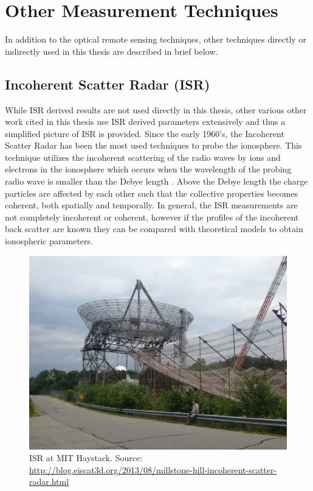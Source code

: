 \documentclass[crop=false,class=mitthesis,oneside,font=12pt]{standalone}
\begin{document}
\section{Other Measurement Techniques}
In addition to the optical remote sensing techniques, other techniques directly or indirectly used in this thesis are described in brief below. 

\subsection{Incoherent Scatter Radar (ISR)}
While ISR derived results are not used directly in this thesis, other various other work cited in this thesis use ISR derived parameters extensively and thus a simplified picture of ISR is provided. Since the early 1960's, the Incoherent Scatter Radar has been the most used techniques to probe the ionosphere. This technique utilizes the incoherent scattering of the radio waves by ions and electrons in the ionosphere which occurs when the wavelength of the probing radio wave is smaller than the Debye length \citep{dougherty1963theory}. Above the Debye length the charge particles are affected by each other such that the collective properties becomes coherent, both spatially and temporally. In general, the ISR measurements are not completely incoherent or coherent, however if the profiles of the incoherent back scatter are known they can be compared with theoretical models to obtain ionospheric parameters. 
\begin{figure}[H]
	\centering\includegraphics[width=30pc]{isr.jpg}
	\caption{ISR at MIT Haystack. Source: \url{http://blog.eiscat3d.org/2013/08/millstone-hill-incoherent-scatter-radar.html}}
	\label{fig:isr_a}
\end{figure}
\end{document}

